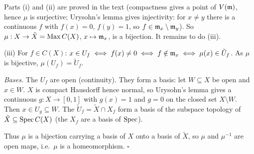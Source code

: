 \documentclass[11pt]{article}
\begin{document}
\pf
Parts (i) and (ii) are proved in the text (compactness gives a point of $V(\mathfrak m)$, hence $\mu$ is surjective; Urysohn's lemma gives injectivity: for $x\ne y$ there is a continuous $f$ with $f(x)=0$, $f(y)=1$, so $f\in\mathfrak m_x\setminus\mathfrak m_y$). So $\mu:X\to\tilde X=\operatorname{Max} C(X)$, $x\mapsto\mathfrak m_x$, is a bijection. It remains to do (iii).

(iii) For $f\in C(X)$: $x\in U_f\iff f(x)\ne0\iff f\notin\mathfrak m_x\iff\mu(x)\in\tilde U_f$. As $\mu$ is bijective, $\mu(U_f)=\tilde U_f$.

\emph{Bases.} The $U_f$ are open (continuity). They form a basis: let $W\subseteq X$ be open and $x\in W$. $X$ is compact Hausdorff hence normal, so Urysohn's lemma gives a continuous $g:X\to[0,1]$ with $g(x)=1$ and $g=0$ on the closed set $X\setminus W$. Then $x\in U_g\subseteq W$. The $\tilde U_f=\tilde X\cap X_f$ form a basis of the subspace topology of $\tilde X\subseteq\operatorname{Spec} C(X)$ (the $X_f$ are a basis of $\operatorname{Spec}$).

Thus $\mu$ is a bijection carrying a basis of $X$ onto a basis of $\tilde X$, so $\mu$ and $\mu^{-1}$ are open maps, i.e.\ $\mu$ is a homeomorphism. \hfill$\square$
\end{document}
